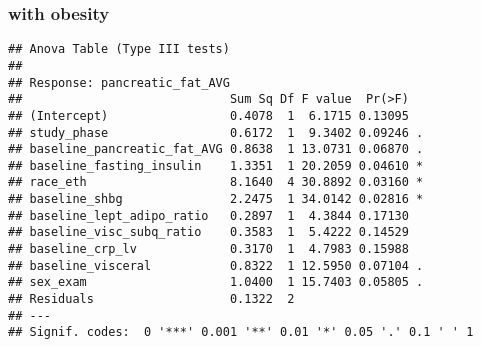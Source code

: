 \documentclass[
]{article}
\begin{document}
\hypertarget{with-obesity-2}{%
\subsubsection{with obesity}\label{with-obesity-2}}

\begin{verbatim}
## Anova Table (Type III tests)
## 
## Response: pancreatic_fat_AVG
##                             Sum Sq Df F value  Pr(>F)  
## (Intercept)                 0.4078  1  6.1715 0.13095  
## study_phase                 0.6172  1  9.3402 0.09246 .
## baseline_pancreatic_fat_AVG 0.8638  1 13.0731 0.06870 .
## baseline_fasting_insulin    1.3351  1 20.2059 0.04610 *
## race_eth                    8.1640  4 30.8892 0.03160 *
## baseline_shbg               2.2475  1 34.0142 0.02816 *
## baseline_lept_adipo_ratio   0.2897  1  4.3844 0.17130  
## baseline_visc_subq_ratio    0.3583  1  5.4222 0.14529  
## baseline_crp_lv             0.3170  1  4.7983 0.15988  
## baseline_visceral           0.8322  1 12.5950 0.07104 .
## sex_exam                    1.0400  1 15.7403 0.05805 .
## Residuals                   0.1322  2                  
## ---
## Signif. codes:  0 '***' 0.001 '**' 0.01 '*' 0.05 '.' 0.1 ' ' 1
\end{verbatim}
\end{document}
